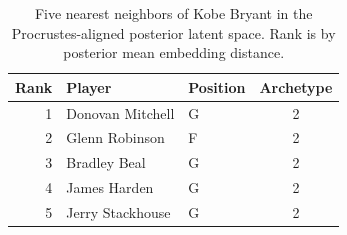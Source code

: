 \begin{table}[htbp]
  \centering\small
  \begin{tabular}{rllc}
    \toprule
    Rank & Player & Position & Archetype \\
    \midrule
    1 & Donovan Mitchell & G & 2 \\
    2 & Glenn Robinson & F & 2 \\
    3 & Bradley Beal & G & 2 \\
    4 & James Harden & G & 2 \\
    5 & Jerry Stackhouse & G & 2 \\
    \bottomrule
  \end{tabular}
  \caption{Five nearest neighbors of Kobe Bryant in the Procrustes-aligned posterior latent space. Rank is by posterior mean embedding distance.}
  \label{tab:Kobe_Bryant_neighbors}
\end{table}


